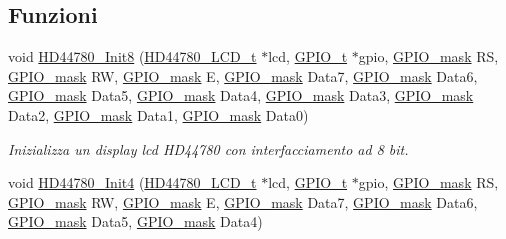 \subsection*{Funzioni}
\begin{DoxyCompactItemize}
\item 
void \hyperlink{group___h_d44780_ga2df14171c71a8afda59e3ae1733c5469}{H\+D44780\+\_\+\+Init8} (\hyperlink{struct_h_d44780___l_c_d__t}{H\+D44780\+\_\+\+L\+C\+D\+\_\+t} $\ast$lcd, \hyperlink{struct_g_p_i_o__t}{G\+P\+I\+O\+\_\+t} $\ast$gpio, \hyperlink{group___g_p_i_o_ga6d5aef8a8a54ee2f602d47252ff66595}{G\+P\+I\+O\+\_\+mask} R\+S, \hyperlink{group___g_p_i_o_ga6d5aef8a8a54ee2f602d47252ff66595}{G\+P\+I\+O\+\_\+mask} R\+W, \hyperlink{group___g_p_i_o_ga6d5aef8a8a54ee2f602d47252ff66595}{G\+P\+I\+O\+\_\+mask} E, \hyperlink{group___g_p_i_o_ga6d5aef8a8a54ee2f602d47252ff66595}{G\+P\+I\+O\+\_\+mask} Data7, \hyperlink{group___g_p_i_o_ga6d5aef8a8a54ee2f602d47252ff66595}{G\+P\+I\+O\+\_\+mask} Data6, \hyperlink{group___g_p_i_o_ga6d5aef8a8a54ee2f602d47252ff66595}{G\+P\+I\+O\+\_\+mask} Data5, \hyperlink{group___g_p_i_o_ga6d5aef8a8a54ee2f602d47252ff66595}{G\+P\+I\+O\+\_\+mask} Data4, \hyperlink{group___g_p_i_o_ga6d5aef8a8a54ee2f602d47252ff66595}{G\+P\+I\+O\+\_\+mask} Data3, \hyperlink{group___g_p_i_o_ga6d5aef8a8a54ee2f602d47252ff66595}{G\+P\+I\+O\+\_\+mask} Data2, \hyperlink{group___g_p_i_o_ga6d5aef8a8a54ee2f602d47252ff66595}{G\+P\+I\+O\+\_\+mask} Data1, \hyperlink{group___g_p_i_o_ga6d5aef8a8a54ee2f602d47252ff66595}{G\+P\+I\+O\+\_\+mask} Data0)
\begin{DoxyCompactList}\small\item\em Inizializza un display lcd H\+D44780 con interfacciamento ad 8 bit. \end{DoxyCompactList}\item 
void \hyperlink{group___h_d44780_gad8f777df204bc630b77924e0a96e5673}{H\+D44780\+\_\+\+Init4} (\hyperlink{struct_h_d44780___l_c_d__t}{H\+D44780\+\_\+\+L\+C\+D\+\_\+t} $\ast$lcd, \hyperlink{struct_g_p_i_o__t}{G\+P\+I\+O\+\_\+t} $\ast$gpio, \hyperlink{group___g_p_i_o_ga6d5aef8a8a54ee2f602d47252ff66595}{G\+P\+I\+O\+\_\+mask} R\+S, \hyperlink{group___g_p_i_o_ga6d5aef8a8a54ee2f602d47252ff66595}{G\+P\+I\+O\+\_\+mask} R\+W, \hyperlink{group___g_p_i_o_ga6d5aef8a8a54ee2f602d47252ff66595}{G\+P\+I\+O\+\_\+mask} E, \hyperlink{group___g_p_i_o_ga6d5aef8a8a54ee2f602d47252ff66595}{G\+P\+I\+O\+\_\+mask} Data7, \hyperlink{group___g_p_i_o_ga6d5aef8a8a54ee2f602d47252ff66595}{G\+P\+I\+O\+\_\+mask} Data6, \hyperlink{group___g_p_i_o_ga6d5aef8a8a54ee2f602d47252ff66595}{G\+P\+I\+O\+\_\+mask} Data5, \hyperlink{group___g_p_i_o_ga6d5aef8a8a54ee2f602d47252ff66595}{G\+P\+I\+O\+\_\+mask} Data4)

\end{DoxyCompactItemize}
